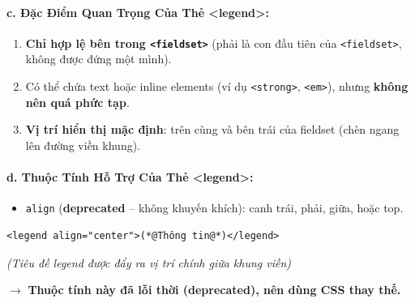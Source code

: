 \documentclass[11pt,oneside]{book}
\newcommand{\codeinline}[1]{\textcolor{accentOrange}{\texttt{#1}}}
\newcommand{\term}[1]{\textbf{\textcolor{primaryBlue}{#1}}}
\begin{document}
\paragraph{c. Đặc Điểm Quan Trọng Của Thẻ <legend>:}
\begin{enumerate}[leftmargin=1.5em, itemsep=3pt, parsep=0pt]
    \item \textbf{Chỉ hợp lệ bên trong \codeinline{<fieldset>}} (phải là con đầu tiên của \codeinline{<fieldset>}, không được đứng một mình).
    \item Có thể chứa text hoặc inline elements (ví dụ \codeinline{<strong>}, \codeinline{<em>}), nhưng \textbf{không nên quá phức tạp}.
    \item \textbf{Vị trí hiển thị mặc định}: trên cùng và bên trái của fieldset (chèn ngang lên đường viền khung).
\end{enumerate}

\paragraph{d. Thuộc Tính Hỗ Trợ Của Thẻ <legend>:}
\begin{itemize}[leftmargin=1.5em, itemsep=3pt, parsep=0pt]
    \item \codeinline{align} (\term{deprecated} – không khuyến khích): canh trái, phải, giữa, hoặc top.
\end{itemize}
\begin{codeWindow}
\begin{lstlisting}[language=HTML5]
<legend align="center">(*@Thông tin@*)</legend>
\end{lstlisting}
\end{codeWindow}

\begin{browserWindow}[Kết Quả Hiển Thị Trình Duyệt: Thẻ <legend align="center">]
\begin{tcolorbox}[
    enhanced, colback=white, colframe=gray!60, boxrule=0.6pt, arc=0pt,
    top=10pt, bottom=10pt, left=10pt, right=10pt,
    coltitle=darkText,
    title={\sffamily\small\textcolor{darkText}{Thông tin}},
    attach boxed title to top center={yshift=-6pt},
    boxed title style={colback=white, colframe=white, boxrule=0pt, left=4pt, right=4pt, top=0pt, bottom=0pt}
]
\sffamily\small\centering
\textcolor{gray!70}{\textit{(Tiêu đề legend được đẩy ra vị trí chính giữa khung viền)}}
\end{tcolorbox}
\end{browserWindow}
\textcolor{primaryBlue}{\textbf{$\rightarrow$}} \textbf{Thuộc tính này đã lỗi thời (deprecated), nên dùng CSS thay thế.}
\end{document}
